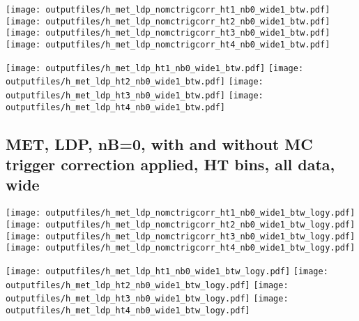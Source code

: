 \documentclass[11pt]{article}
\begin{document}
    \noindent
     \texttt{[image: outputfiles/h\_met\_ldp\_nomctrigcorr\_ht1\_nb0\_wide1\_btw.pdf]}
     \texttt{[image: outputfiles/h\_met\_ldp\_nomctrigcorr\_ht2\_nb0\_wide1\_btw.pdf]}
     \texttt{[image: outputfiles/h\_met\_ldp\_nomctrigcorr\_ht3\_nb0\_wide1\_btw.pdf]}
     \texttt{[image: outputfiles/h\_met\_ldp\_nomctrigcorr\_ht4\_nb0\_wide1\_btw.pdf]}

    \noindent
     \texttt{[image: outputfiles/h\_met\_ldp\_ht1\_nb0\_wide1\_btw.pdf]}
     \texttt{[image: outputfiles/h\_met\_ldp\_ht2\_nb0\_wide1\_btw.pdf]}
     \texttt{[image: outputfiles/h\_met\_ldp\_ht3\_nb0\_wide1\_btw.pdf]}
     \texttt{[image: outputfiles/h\_met\_ldp\_ht4\_nb0\_wide1\_btw.pdf]}

    \clearpage
     \subsection{ MET, LDP, nB=0, with and without MC trigger correction applied, HT bins, all data, wide}

    \noindent
     \texttt{[image: outputfiles/h\_met\_ldp\_nomctrigcorr\_ht1\_nb0\_wide1\_btw\_logy.pdf]}
     \texttt{[image: outputfiles/h\_met\_ldp\_nomctrigcorr\_ht2\_nb0\_wide1\_btw\_logy.pdf]}
     \texttt{[image: outputfiles/h\_met\_ldp\_nomctrigcorr\_ht3\_nb0\_wide1\_btw\_logy.pdf]}
     \texttt{[image: outputfiles/h\_met\_ldp\_nomctrigcorr\_ht4\_nb0\_wide1\_btw\_logy.pdf]}

    \noindent
     \texttt{[image: outputfiles/h\_met\_ldp\_ht1\_nb0\_wide1\_btw\_logy.pdf]}
     \texttt{[image: outputfiles/h\_met\_ldp\_ht2\_nb0\_wide1\_btw\_logy.pdf]}
     \texttt{[image: outputfiles/h\_met\_ldp\_ht3\_nb0\_wide1\_btw\_logy.pdf]}
     \texttt{[image: outputfiles/h\_met\_ldp\_ht4\_nb0\_wide1\_btw\_logy.pdf]}

    \clearpage


\end{document}
